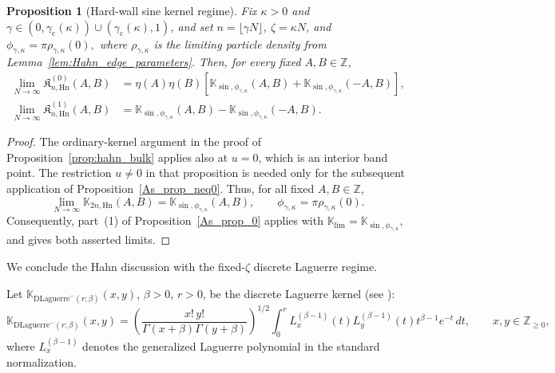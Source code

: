 \documentclass[reqno,11pt]{amsart}
\newcommand{\ZZ}{\mathbb{Z}}
\theoremstyle{plain}
\newtheorem{prop}[thm]{Proposition}
\theoremstyle{definition}
\numberwithin{equation}{section}
\begin{document}
\begin{prop}[Hard-wall sine kernel regime]\label{Hahn_hard-wall_sine}
Fix $\kappa>0$ and
$\gamma\in
\left(0,\gamma_{\mathrm c}(\kappa)\right)\cup
\left(\gamma_{\mathrm c}(\kappa),1\right)$,
and set
$
n=\lfloor\gamma N\rfloor$, $\zeta=\kappa N$,
and
$
\phi_{\gamma,\kappa}
=
\pi\rho_{\gamma,\kappa}(0),
$
where \(\rho_{\gamma,\kappa}\) is the limiting particle density from
Lemma~\ref{lem:Hahn_edge_parameters}. Then, for every fixed
\(A,B\in\ZZ\),
\begin{align*}
\lim_{N\to\infty}
\mathfrak K^{(0)}_{n,\mathrm{Hn}}(A,B)
&=
\eta(A)\eta(B)
\left[
\mathbb K_{\sin,\phi_{\gamma,\kappa}}(A,B)
+
\mathbb K_{\sin,\phi_{\gamma,\kappa}}(-A,B)
\right],\\
\lim_{N\to\infty}
\mathfrak K^{(1)}_{n,\mathrm{Hn}}(A,B)
&=
\mathbb K_{\sin,\phi_{\gamma,\kappa}}(A,B)
-
\mathbb K_{\sin,\phi_{\gamma,\kappa}}(-A,B).
\end{align*}
\end{prop}
\begin{proof}
The ordinary-kernel argument in the proof of Proposition~\ref{prop:hahn_bulk} applies also at $u=0$, which is an interior band point. The restriction $u\neq0$ in that proposition is needed only for the subsequent application of Proposition~\ref{As_prop_neq0}. Thus, for all fixed $A,B\in\ZZ$,
\[
\lim_{N\to\infty}
\mathbb K_{2n,\mathrm{Hn}}(A,B)
=
\mathbb K_{\sin,\phi_{\gamma,\kappa}}(A,B),
\qquad
\phi_{\gamma,\kappa}
=
\pi\rho_{\gamma,\kappa}(0).
\]
Consequently, part~(1) of Proposition~\ref{As_prop_0} applies with
$
\mathbb K_{\lim}
=
\mathbb K_{\sin,\phi_{\gamma,\kappa}},
$
and gives both asserted limits.
\end{proof}
We conclude the Hahn discussion with the fixed-$\zeta$ discrete Laguerre regime.

Let $\mathbb K_{\mathrm{DLaguerre}^{-}(r;\beta)}(x,y)$, $\beta>0$, $r>0$, be the discrete Laguerre kernel
(see \cite{Borodin_2017}):
\[
\mathbb K_{\mathrm{DLaguerre}^{-}(r;\beta)}(x,y)
=
\left(
\frac{x!\,y!}
{\Gamma(x+\beta)\Gamma(y+\beta)}
\right)^{1/2}
\int_0^r
L_x^{(\beta-1)}(t)
L_y^{(\beta-1)}(t)
t^{\beta-1}e^{-t}\,dt,
\qquad
x,y\in\ZZ_{\geq0},
\]
where \(L_x^{(\beta-1)}\) denotes the generalized Laguerre polynomial in the standard normalization.
\end{document}
